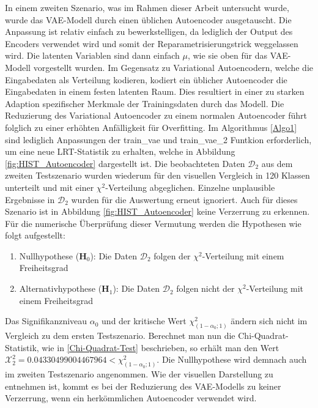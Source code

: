 \documentclass[%
thesis=student,%
coverpage=false,%
titlepage=false,%
headmarks=true, %
german,%
font=libertine, %
math=newpxtx, %
BCOR=5mm,%
coverBCOR=11mm%
]{tumbook}
\theoremstyle{break}
\begin{document}
In einem zweiten Szenario, was im Rahmen dieser Arbeit untersucht wurde, wurde das VAE-Modell durch einen üblichen Autoencoder ausgetauscht. Die Anpassung ist relativ einfach zu bewerkstelligen, da lediglich der Output des Encoders verwendet wird und somit der Reparametrisierungstrick weggelassen wird. Die latenten Variablen sind dann einfach $\mu$, wie sie oben für das VAE-Modell vorgestellt wurden. Im Gegensatz zu Variational Autoencodern, welche die Eingabedaten als Verteilung kodieren, kodiert ein üblicher Autoencoder die Eingabedaten in einem festen latenten Raum. Dies resultiert in einer zu starken Adaption spezifischer Merkmale der Trainingsdaten durch das Modell. Die Reduzierung des Variational Autoencoder zu einem normalen Autoencoder führt folglich zu einer erhöhten Anfälligkeit für Overfitting. Im Algorithmus \ref{Algo1} sind lediglich Anpassungen der train\_vae und train\_vae\_2 Funtkion erforderlich, um eine neue LRT-Statistik zu erhalten, welche in Abbildung \ref{fig:HIST_Autoencoder} dargestellt ist. Die beobachteten Daten $\mathcal{D}_2$ aus dem zweiten Testszenario wurden wiederum für den visuellen Vergleich in 120 Klassen unterteilt und mit einer $\chi^2$-Verteilung abgeglichen. Einzelne unplausible Ergebnisse in $\mathcal{D}_2$ wurden für die Auswertung  erneut ignoriert. Auch für dieses Szenario ist in Abbildung \ref{fig:HIST_Autoencoder} keine Verzerrung zu erkennen. Für die numerische Überprüfung dieser Vermutung werden die Hypothesen wie folgt aufgestellt:\\
\begin{enumerate}
	\item Nullhypothese ($\mathbf{H}_0$): Die Daten $\mathcal{D}_2$ folgen der $\chi^2$-Verteilung mit einem Freiheitsgrad\\
	\item Alternativhypothese ($\mathbf{H}_1$): Die Daten $\mathcal{D}_2$ folgen nicht der $\chi^2$-Verteilung mit einem Freiheitsgrad \\
\end{enumerate}
Das Signifikanzniveau $\alpha_0$ und der kritische Wert $\chi^2_{(1-\alpha_0; 1)}$ ändern sich nicht im Vergleich zu dem ersten Testszenario.
Berechnet man nun die Chi-Quadrat-Statistik, wie in \ref{Chi-Quadrat-Test} beschrieben, so erhält man den Wert $\mathcal{X}^2_2 = 0.04330499004467964 < \chi^2_{(1-\alpha_0; 1)}$. Die Nullhypothese wird demnach auch im zweiten Testszenario angenommen. Wie der visuellen Darstellung zu entnehmen ist, kommt es bei der Reduzierung des VAE-Modells zu keiner Verzerrung, wenn ein herkömmlichen Autoencoder verwendet wird. \\
\end{document}

